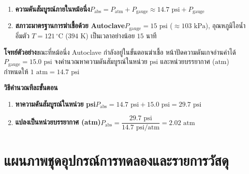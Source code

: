 \begin{conceptbox}
\begin{enumerate}
    \item \textbf{ความดันสัมบูรณ์ภายในหม้อนึ่ง}\quad $P_{\text{abs}} = P_{\text{atm}} + P_{\text{gauge}} \approx 14.7\text{ psi} + P_{\text{gauge}}$
    \item \textbf{สภาวะมาตรฐานการฆ่าเชื้อด้วย Autoclave}\quad $P_{\text{gauge}} = 15\text{ psi}$ ($\approx 103\text{ kPa}$), อุณหภูมิไอน้ำอิ่มตัว $T = 121\,^\circ\text{C}$ ($394\text{ K}$) เป็นเวลาอย่างน้อย $15\text{ นาที}$
\end{enumerate}
\end{conceptbox}

\begin{worked}
\textbf{โจทย์ตัวอย่าง}\quad ขณะที่หม้อนึ่ง Autoclave กำลังอยู่ในขั้นตอนฆ่าเชื้อ หน้าปัดความดันเกจอ่านค่าได้ $P_{\text{gauge}} = 15.0\text{ psi}$ จงคำนวณหาความดันสัมบูรณ์ในหน่วย $\text{psi}$ และหน่วยบรรยากาศ ($\text{atm}$) กำหนดให้ $1\text{ atm} = 14.7\text{ psi}$

\textbf{วิธีคำนวณทีละขั้นตอน}
\begin{enumerate}
    \item \textbf{หาความดันสัมบูรณ์ในหน่วย psi}\quad $P_{\text{abs}} = 14.7\text{ psi} + 15.0\text{ psi} = 29.7\text{ psi}$
    \item \textbf{แปลงเป็นหน่วยบรรยากาศ (atm)}\quad $P_{\text{abs}} = \dfrac{29.7\text{ psi}}{14.7\text{ psi/atm}} = 2.02\text{ atm}$
\end{enumerate}
\end{worked}

\section{แผนภาพชุดอุปกรณ์การทดลองและรายการวัสดุ}

